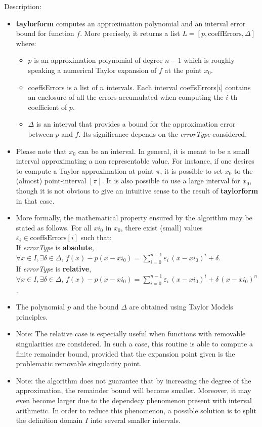 \noindent Description: \begin{itemize}

\item \textbf{taylorform} computes an approximation polynomial and an interval error bound for function $f$. More precisely, it 
   returns a list $L = \left[p, \textrm{coeffErrors}, \Delta \right]$ where:
   \begin{itemize}
   \item $p$ is an approximation polynomial of degree $n-1$ which is roughly speaking a numerical Taylor expansion of $f$ at the point $x_0$.
   \item coeffsErrors is a list of $n$ intervals. Each interval coeffsErrors[$i$] contains an enclosure of all the errors accumulated when computing the $i$-th coefficient of $p$.
   \item $\Delta$ is an interval that provides a bound for the approximation error between $p$ and $f$. Its significance depends on the \emph{errorType} considered.
   \end{itemize}

\item Please note that $x_0$ can be an interval. In general, it is meant to be a small interval approximating a non representable value. For instance, if one desires to compute a Taylor approximation at point $\pi$, it is possible to set $x_0$ to the (almost) point-interval $[\pi]$. It is also possible to use a large interval for $x_0$, though it is not obvious to give an intuitive sense to the result of \textbf{taylorform} in that case.

\item More formally, the mathematical property ensured by the algorithm may be stated as follows. For all $xi_0$ in $x_0$, there exist (small) values $\varepsilon_i \in \textrm{coeffsErrors}[i]$ such that:
   \\
   If \emph{errorType} is \textbf{absolute}, $\forall x \in I, \exists \delta \in \Delta,\, f(x)-p(x-xi_0) = \sum\limits_{i=0}^{n-1} \varepsilon_i\, (x-xi_0)^i + \delta$.
   \\
   If \emph{errorType} is \textbf{relative}, $\forall x \in I, \exists \delta \in \Delta,\, f(x)-p(x-xi_0) = \sum\limits_{i=0}^{n-1} \varepsilon_i\, (x-xi_0)^i + \delta\,(x-xi_0)^n$.

\item The polynomial $p$ and the bound  $\Delta$ are obtained using Taylor Models principles.

\item Note: The relative case is especially useful when functions with removable singularities are considered. In such a case, this routine is able to compute a finite remainder bound, provided that the expansion point given is the problematic removable singularity point.

\item Note: the algorithm does not guarantee that by increasing the degree of the approximation, the remainder bound will become smaller. Moreover, it may 
   even become larger due to the dependecy phenomenon present with interval arithmetic. In order to reduce this phenomenon, a possible solution is to split the definition domain $I$ into several smaller intervals. 
\end{itemize}
